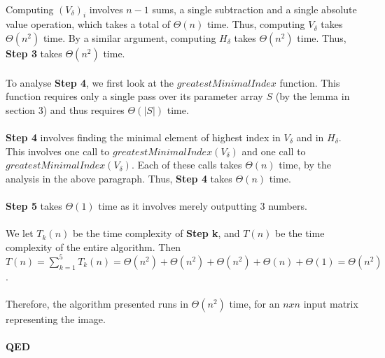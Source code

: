 \documentclass[]{article}
\begin{document}
		\paragraph{}
		Computing $(V_\delta)_i$ involves $n - 1$ sums, a single subtraction and a single absolute value operation, which takes a total of $\Theta(n)$ time. Thus, computing $V_\delta$ takes $\Theta(n^2)$ time. By a similar argument, computing $H_\delta$ takes $\Theta(n^2)$ time. Thus, \textbf{Step 3} takes $\Theta(n^2)$ time.
		
		\paragraph{}
		To analyse \textbf{Step 4}, we first look at the $greatestMinimalIndex$ function. This function requires only a single pass over its parameter array $S$ (by the lemma in section 3) and thus requires $\Theta(|S|)$ time.
		
		\paragraph{}
		\textbf{Step 4} involves finding the minimal element of highest index in $V_\delta$ and in $H_\delta$. This involves one call to $greatestMinimalIndex(V_\delta)$ and one call to $greatestMinimalIndex(V_\delta)$. Each of these calls takes $\Theta(n)$ time, by the analysis in the above paragraph. Thus, \textbf{Step 4} takes $\Theta(n)$ time.
		
		\paragraph{}
		\textbf{Step 5} takes $\Theta(1)$ time as it involves merely outputting 3 numbers.
		
		\paragraph{}
		We let $T_k(n)$ be the time complexity of \textbf{Step k}, and $T(n)$ be the time complexity of the entire algorithm. Then $T(n) = \sum\nolimits_{k = 1}^5 T_k(n) = \Theta(n^2) + \Theta(n^2) + \Theta(n^2) + \Theta(n) + \Theta(1) = \Theta(n^2)$.
		
		\paragraph{}
		Therefore, the algorithm presented runs in $\Theta(n^2)$ time, for an $n x n$ input matrix representing the image.
		
		\paragraph{QED}
	
	
\end{document}
